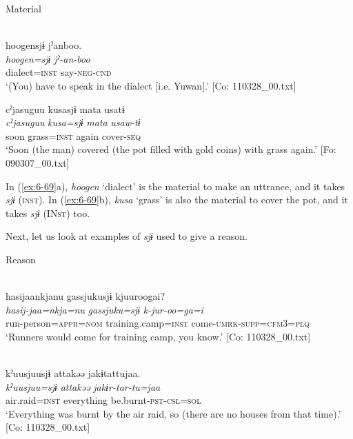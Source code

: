 \begin{table}
\ea\label{ex:6-69}
  Material

 \ea{}\\
{\TM}
\glll  {\textbar}hoogen{\textbar}sjɨ  jˀanboo.\\
\textit{hoogen=sjɨ}  \textit{jˀ-an-boo}\\
dialect=\textsc{inst}  say-\textsc{neg}-\textsc{cnd}\\
\glt ‘(You) have to speak in the dialect [i.e. Yuwan].’ [Co: 110328\_00.txt]
\z

\ex {\TM}  cˀjasuguu  kusasjɨ  mata  usatɨ\\
\glll \textit{cˀjasuguu}  \textit{kusa=sjɨ}  \textit{mata}  \textit{usaw-tɨ}\\
soon  grass=\textsc{inst}  again  cover-\textsc{seq}\\
\glt ‘Soon (the man) covered (the pot filled with gold coins) with grass again.’ [Fo: 090307\_00.txt]
\z

In (\ref{ex:6-69}a), \textit{hoogen} ‘dialect’ is the material to make an uttrance, and it takes \textit{sjɨ} (\textsc{inst}). In (\ref{ex:6-69}b), \textit{kusa} ‘grass’ is also the material to cover the pot, and it takes \textit{sjɨ} (IN\textsc{st}) too.

Next, let us look at examples of \textit{sjɨ} used to give a reason.

\ea\label{ex:6-70}
  Reason

 \ea{}\\
{\TM}
\glll  hasijaankjanu  {\textbar}gassjuku{\textbar}sjɨ  kjuuroogai?\\
\textit{hasij-jaa=nkja=nu}  \textit{gassjuku=sjɨ}  \textit{k-jur-oo=ga=i}\\
run-person=\textsc{appr}=\textsc{nom}  training.camp=\textsc{inst}  come-\textsc{umrk}-\textsc{supp}=\textsc{cfm}3=\textsc{plq}\\
\glt ‘Runners would come for training camp, you know.’ [Co: 110328\_00.txt]
\z

\ex{}\\
{\TM}
\glll  kˀuusjuusjɨ  attakəə  jakɨtattujaa.\\
\textit{kˀuusjuu=sjɨ}  \textit{attakəə}  \textit{jakɨr-tar-tu=jaa}\\
air.raid=\textsc{inst}  everything  be.burnt-\textsc{pst}-\textsc{csl}=\textsc{sol}\\
\glt ‘Everything was burnt by the air raid, so (there are no houses from that time).’ [Co: 110328\_00.txt]
\z


\end{table}
